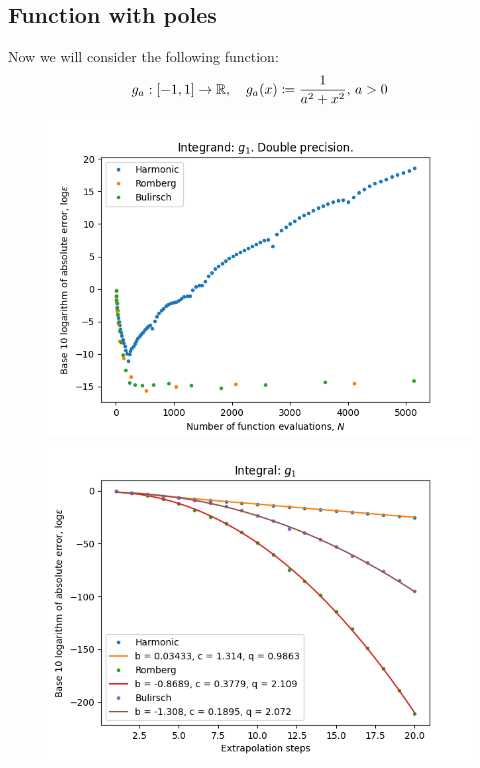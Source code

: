 \subsection{Function with poles}

Now we will consider the following function:
\[
g_a: [-1, 1] \rightarrow \mathbb{R}, \quad g_a(x) \coloneqq \frac{1}{a^2 + x^2},\, a > 0
\]
\begin{figure}[H]
\centering
\begin{minipage}{0.45\textwidth}
\centering
\includegraphics[scale=0.45]{romberg_plots/g_one.png}
\end{minipage}
\begin{minipage}{0.45\textwidth}
\centering
\includegraphics[scale=0.45]{romberg_plots/g_one_hp_steps.png}
\end{minipage}
\end{figure}

